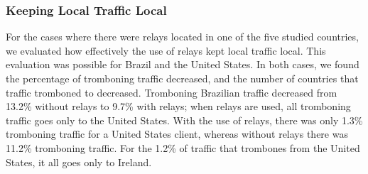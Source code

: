 \subsubsection{Keeping Local Traffic Local}
For the cases where there were relays located in one of the five studied countries, we evaluated how effectively the use of relays kept local traffic local.  This evaluation was possible for Brazil and the United States.  In both cases, we found the percentage of tromboning traffic decreased, and the number of countries that traffic tromboned to decreased.  Tromboning Brazilian traffic decreased from 13.2\% without relays to 9.7\% with relays; when relays are used, all tromboning traffic goes only to the United States.  With the use of relays, there was only 1.3\% tromboning traffic for a United States client, whereas without relays there was 11.2\% tromboning traffic.  For the 1.2\% of traffic that trombones from the United States, it all goes only to Ireland.
